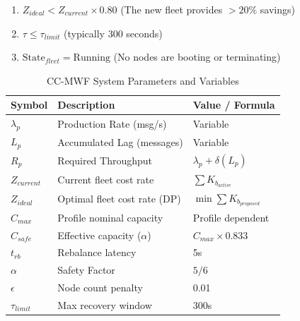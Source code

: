 ﻿\documentclass[conference]{IEEEtran}
\begin{document}
\begin{enumerate}


    \item $Z_{ideal} < Z_{current} \times 0.80$ (The new fleet provides $>20\%$ savings)


    \item $\tau \le \tau_{limit}$ (typically 300 seconds)


    \item $\text{State}_{fleet} = \text{Running}$ (No nodes are booting or terminating)


\end{enumerate}




\begin{table}[htbp]
\centering
\small
\setlength{\tabcolsep}{0.5pt}
\caption{CC-MWF System Parameters and Variables}
\label{table:system_parameters}
\begin{center}
\begin{tabular}{|l|l|l|}
\hline
\textbf{Symbol} & \textbf{Description} & \textbf{Value / Formula} \\ \hline
$\lambda_p$ & Production Rate (msg/s) & Variable \\ \hline
$L_p$ & Accumulated Lag (messages) & Variable \\ \hline
$R_p$ & Required Throughput & $\lambda_p + \delta(L_p)$ \\ \hline
$Z_{current}$ & Current fleet cost rate & $\sum K_{b_{active}}$ \\ \hline
$Z_{ideal}$ & Optimal fleet cost rate (DP) & $\min \sum K_{b_{proposed}}$ \\ \hline
$C_{max}$ & Profile nominal capacity & Profile dependent \\ \hline
$C_{safe}$ & Effective capacity ($\alpha$) & $C_{max} \times 0.833$ \\ \hline
$t_{rb}$ & Rebalance latency & 5s \\ \hline
$\alpha$ & Safety Factor & $5/6$ \\ \hline
$\epsilon$ & Node count penalty & 0.01 \\ \hline
$\tau_{limit}$ & Max recovery window & 300s \\ \hline
\end{tabular}
\end{center}
\end{table}

\end{document}
